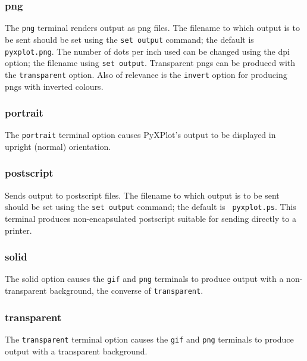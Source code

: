 \subsubsection{png}

The {\tt png} terminal renders output as png files. The filename to which output
is to be sent should be set using the {\tt set output} command; the default is
{\tt pyxplot.png}. The number of dots per inch used can be changed using the dpi
option; the filename using {\tt set output}. Transparent pngs can be produced
with the {\tt transparent} option. Also of relevance is the {\tt invert} option
for producing pngs with inverted colours.


\subsubsection{portrait}

The {\tt portrait} terminal option causes PyXPlot's output to be displayed in
upright (normal) orientation.
 

\subsubsection{postscript}

Sends output to postscript files. The filename to which output is to be sent
should be set using the {\tt set output} command; the default is {\tt
pyxplot.ps}.  This terminal produces non-encapsulated postscript suitable for
sending directly to a printer.

\subsubsection{solid}

The solid option causes the {\tt gif} and {\tt png} terminals to produce output
with a non-transparent background, the converse of {\tt transparent}.


\subsubsection{transparent}

The {\tt transparent} terminal option causes the {\tt gif} and {\tt png}
terminals to produce output with a transparent background.


